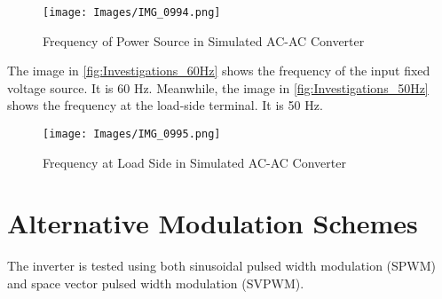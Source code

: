 \begin{figure}[h]
    \centering
    \texttt{[image: Images/IMG\_0994.png]}
    \caption{Frequency of Power Source in Simulated AC-AC Converter}
    \label{fig:Investigations_60Hz}
\end{figure}

The image in \autoref{fig:Investigations_60Hz} shows the frequency of the input fixed voltage source. It is 60 Hz. Meanwhile, the image in \autoref{fig:Investigations_50Hz} shows the frequency at the load-side terminal. It is 50 Hz.

\begin{figure}[h]
    \centering
    \texttt{[image: Images/IMG\_0995.png]}
    \caption{Frequency at Load Side in Simulated AC-AC Converter}
    \label{fig:Investigations_50Hz}
\end{figure}



\section{Alternative Modulation Schemes}

The inverter is tested using both sinusoidal pulsed width modulation (SPWM) and space vector pulsed width modulation (SVPWM). 